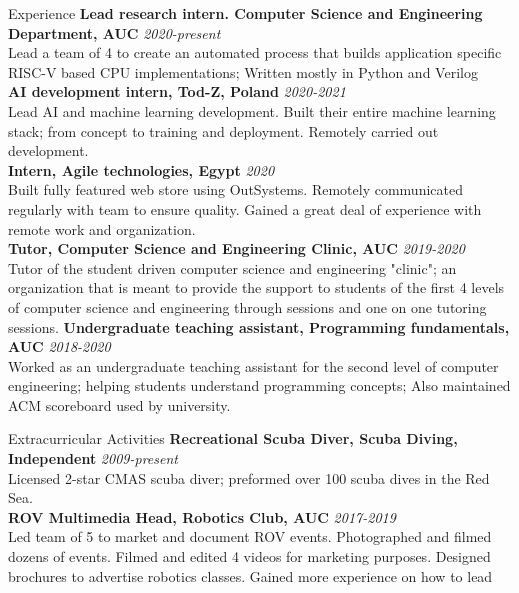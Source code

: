 \documentclass{resume}
\begin{document}
\begin{small}
	\begin{rSection}{Experience}
		{\bf Lead research intern. Computer Science and Engineering Department, AUC} \hfill {\em 2020-present} \\
		Lead a team of 4 to create an automated process that builds application specific RISC-V based CPU implementations; Written mostly in Python and Verilog \\
		{\bf AI development intern, Tod-Z, Poland} \hfill {\em 2020-2021} \\
		Lead AI and machine learning development. Built their entire machine learning stack; from concept to training and deployment. Remotely carried out development. \\
		{\bf Intern, Agile technologies, Egypt} \hfill {\em 2020} \\
		Built fully featured web store using OutSystems. Remotely communicated regularly with team to ensure quality. Gained a great deal of experience with remote work and organization. \\
		{\bf Tutor, Computer Science and Engineering Clinic, AUC} \hfill {\em 2019-2020} \\
		Tutor of the student driven computer science and engineering "clinic"; an organization that is meant to provide the support to students of the first 4 levels of computer science and engineering through sessions and one on one tutoring sessions.
		{\bf Undergraduate teaching assistant, Programming fundamentals, AUC} \hfill {\em 2018-2020} \\
		Worked as an undergraduate teaching assistant for the second level of computer engineering; helping students understand programming concepts; Also maintained ACM scoreboard used by university. \\
	\end{rSection}
	\begin{rSection} {Extracurricular Activities}
		{\bf Recreational Scuba Diver, Scuba Diving, Independent} \hfill {\em 2009-present}\\
		Licensed 2-star CMAS scuba diver; preformed over 100 scuba dives in the Red Sea.\\
		{\bf ROV Multimedia Head, Robotics Club, AUC} \hfill {\em 2017-2019} \\
		Led team of 5 to market and document ROV events. Photographed and filmed dozens of events. Filmed and edited 4 videos for marketing purposes. Designed brochures to advertise robotics classes. Gained more experience on how to lead\\

\end{rSection}
\end{small}
\end{document}
